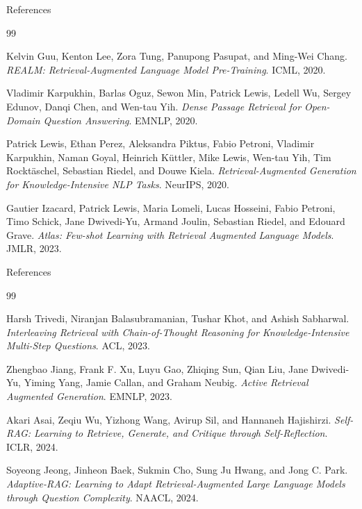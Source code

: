 \documentclass{beamer}
\begin{document}
\begin{frame}[allowframebreaks]{References}
\footnotesize
\begin{thebibliography}{99}

Kelvin Guu, Kenton Lee, Zora Tung, Panupong Pasupat, and Ming-Wei Chang.
\newblock \textit{REALM: Retrieval-Augmented Language Model Pre-Training}.
\newblock ICML, 2020.

Vladimir Karpukhin, Barlas Oguz, Sewon Min, Patrick Lewis, Ledell Wu, Sergey Edunov, Danqi Chen, and Wen-tau Yih.
\newblock \textit{Dense Passage Retrieval for Open-Domain Question Answering}.
\newblock EMNLP, 2020.

Patrick Lewis, Ethan Perez, Aleksandra Piktus, Fabio Petroni, Vladimir Karpukhin, Naman Goyal, Heinrich K{\"u}ttler, Mike Lewis, Wen-tau Yih, Tim Rockt{\"a}schel, Sebastian Riedel, and Douwe Kiela.
\newblock \textit{Retrieval-Augmented Generation for Knowledge-Intensive NLP Tasks}.
\newblock NeurIPS, 2020.

Gautier Izacard, Patrick Lewis, Maria Lomeli, Lucas Hosseini, Fabio Petroni, Timo Schick, Jane Dwivedi-Yu, Armand Joulin, Sebastian Riedel, and Edouard Grave.
\newblock \textit{Atlas: Few-shot Learning with Retrieval Augmented Language Models}.
\newblock JMLR, 2023.

\end{thebibliography}
\end{frame}

\begin{frame}[allowframebreaks]{References}
\footnotesize
\begin{thebibliography}{99}

Harsh Trivedi, Niranjan Balasubramanian, Tushar Khot, and Ashish Sabharwal.
\newblock \textit{Interleaving Retrieval with Chain-of-Thought Reasoning for Knowledge-Intensive Multi-Step Questions}.
\newblock ACL, 2023.

Zhengbao Jiang, Frank F. Xu, Luyu Gao, Zhiqing Sun, Qian Liu, Jane Dwivedi-Yu, Yiming Yang, Jamie Callan, and Graham Neubig.
\newblock \textit{Active Retrieval Augmented Generation}.
\newblock EMNLP, 2023.

Akari Asai, Zeqiu Wu, Yizhong Wang, Avirup Sil, and Hannaneh Hajishirzi.
\newblock \textit{Self-RAG: Learning to Retrieve, Generate, and Critique through Self-Reflection}.
\newblock ICLR, 2024.

Soyeong Jeong, Jinheon Baek, Sukmin Cho, Sung Ju Hwang, and Jong C. Park.
\newblock \textit{Adaptive-RAG: Learning to Adapt Retrieval-Augmented Large Language Models through Question Complexity}.
\newblock NAACL, 2024.

\end{thebibliography}
\end{frame}
\end{document}
